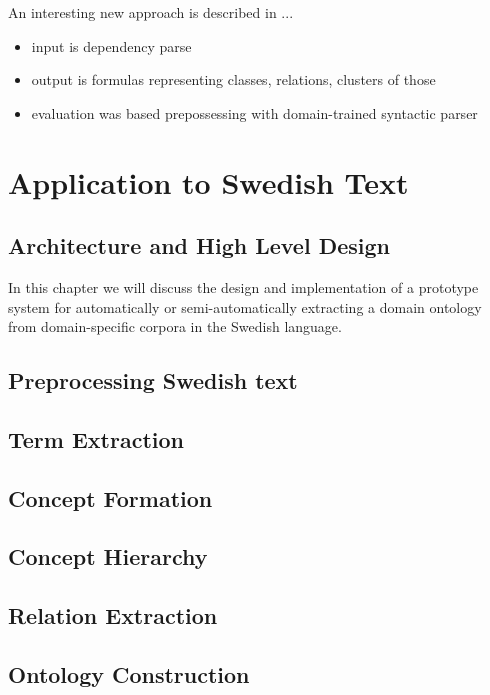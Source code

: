 \documentclass[a4paper]{report}
\begin{document}
An interesting new approach is described in \cite{Poon2010OntoUSP}...
\begin{itemize}
  \item{input is dependency parse}
  \item{output is formulas representing classes, relations, clusters of those}
  \item{evaluation was based prepossessing with domain-trained syntactic parser}
\end{itemize}

\chapter{Application to Swedish Text}

\section{Architecture and High Level Design}

In this chapter we will discuss the design and implementation of a prototype system for automatically or semi-automatically extracting a domain ontology from domain-specific corpora in the Swedish language.

\section{Preprocessing Swedish text}

\section{Term Extraction}

\section{Concept Formation}

\section{Concept Hierarchy}

\section{Relation Extraction}

\section{Ontology Construction}
\end{document}
